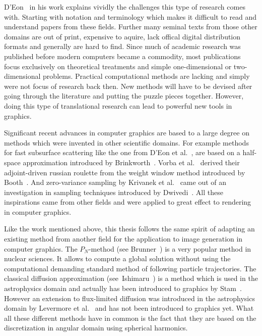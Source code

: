 D'Eon~\cite{DEon14} in his work explains vividly the challenges this type of research comes with. Starting with notation and terminology which makes it difficult to read and understand papers from these fields. Further many seminal texts from those other domains are out of print, expensive to aquire, lack offical digital distribution formats and generally are hard to find. Since much of academic research was published before modern computers became a commodity, most publications focus exclusively on theoretical treatments and simple one-dimensional or two-dimensional problems. Practical computational methods are lacking and simply were not focus of research back then. New methods will have to be devised after going through the literature and putting the puzzle pieces together. However, doing this type of translational research can lead to powerful new tools in graphics.

Significant recent advances in computer graphics are based to a large degree on methods which were invented in other scientific domains. For example methods for fast subsurface scattering like the one from D'Eon et al.~\cite{dEon11}, are based on a half-space approximation introduced by Brinkworth~\cite{Brinkworth64}. Vorba et al.~\cite{Vorba16} derived their adjoint-driven russian roulette from the weight window method introduced by Booth~\cite{Booth85}. And zero-variance sampling by Krivanek et al.~\cite{Krivanek14} came out of an investigation in sampling techniques introduced by Dwivedi~\cite{Dwivedi82}. All these inspirations came from other fields and were applied to great effect to rendering in computer graphics.

Like the work mentioned above, this thesis follows the same spirit of adapting an existing method from another field for the application to image generation in computer graphics. The $P_N$-method (see Brunner~\cite{Brunner02}) is a very popular method in nuclear sciences. It allows to compute a global solution without using the computational demanding standard method of following particle trajectories. The classical diffusion approximation (see~Ishimaru~\cite{Ishimaru78}) is a method which is used in the astrophysics domain and actually has been introduced to graphics by Stam~\cite{Stam95}. However an extension to flux-limited diffusion was introduced in the astrophysics domain by Levermore et al.~\cite{Levermore81} and has not been introduced to graphics yet. What all these different methods have in common is the fact that they are based on the discretization in angular domain using spherical harmonics.


